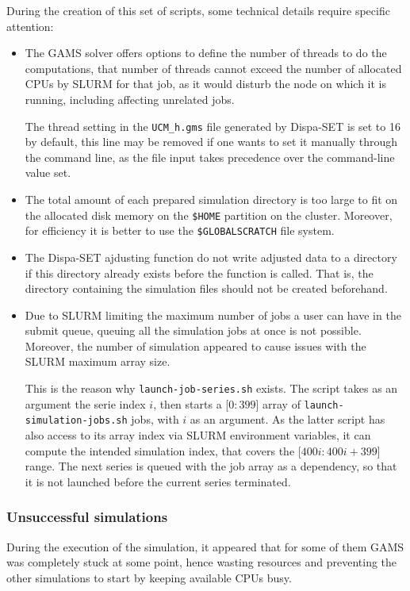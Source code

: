 During the creation of this set of scripts, some technical details require specific attention:
\begin{itemize}
    \item The GAMS solver offers options to define the number of threads to do the computations, that number of threads cannot exceed the number of allocated CPUs by SLURM for that job, as it would disturb the node on which it is running, including affecting unrelated jobs.
    
    The thread setting in the \texttt{UCM\_h.gms} file generated by Dispa-SET is set to 16 by default, this line may be removed if one wants to set it manually through the command line, as the file input takes precedence over the command-line value set.
    \item The total amount of each prepared simulation directory is too large to fit on the allocated disk memory on the \texttt{\$HOME} partition on the cluster. Moreover, for efficiency it is better to use the \texttt{\$GLOBALSCRATCH} file system.
    \item The Dispa-SET ajdusting function do not write adjusted data to a directory if this directory already exists before the function is called. That is, the directory containing the simulation files should not be created beforehand.
    \item Due to SLURM limiting the maximum number of jobs a user can have in the submit queue, queuing all the simulation jobs at once is not possible. Moreover, the number of simulation appeared to cause issues with the SLURM maximum array size.

    This is the reason why \texttt{launch-job-series.sh} exists. The script takes as an argument the serie index $i$, then starts a [$0:399$] array of \texttt{launch-simulation-jobs.sh} jobs, with $i$ as an argument. As the latter script has also access to its array index via SLURM environment variables, it can compute the intended simulation index, that covers the [$400i:400i+399$] range. The next series is queued with the job array as a dependency, so that it is not launched before the current series terminated.
\end{itemize}

\subsubsection{Unsuccessful simulations}

During the execution of the simulation, it appeared that for some of them GAMS was completely stuck at some point, hence wasting resources and preventing the other simulations to start by keeping available CPUs busy.

